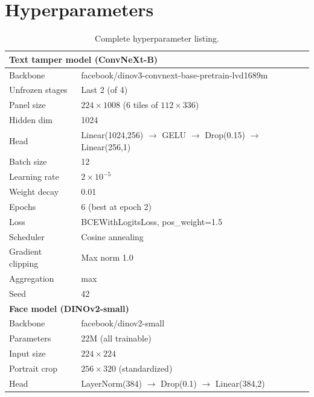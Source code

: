 \documentclass[11pt,a4paper]{article}
\begin{document}



\appendix
\section{Hyperparameters}
\label{app:hparams}

\begin{table}[H]
  \centering
  \small
  \caption{Complete hyperparameter listing.}
  \begin{tabular}{ll}
    \toprule
    \multicolumn{2}{l}{\textbf{Text tamper model (ConvNeXt-B)}} \\
    \midrule
    Backbone          & facebook/dinov3-convnext-base-pretrain-lvd1689m \\
    Unfrozen stages   & Last 2 (of 4) \\
    Panel size        & $224 \times 1008$ (6 tiles of $112 \times 336$) \\
    Hidden dim        & 1024 \\
    Head              & Linear(1024,256) $\rightarrow$ GELU $\rightarrow$ Drop(0.15) $\rightarrow$ Linear(256,1) \\
    Batch size        & 12 \\
    Learning rate     & $2 \times 10^{-5}$ \\
    Weight decay      & 0.01 \\
    Epochs            & 6 (best at epoch 2) \\
    Loss              & BCEWithLogitsLoss, pos\_weight=1.5 \\
    Scheduler         & Cosine annealing \\
    Gradient clipping & Max norm 1.0 \\
    Aggregation       & max \\
    Seed              & 42 \\
    \midrule
    \multicolumn{2}{l}{\textbf{Face model (DINOv2-small)}} \\
    \midrule
    Backbone          & facebook/dinov2-small \\
    Parameters        & 22M (all trainable) \\
    Input size        & $224 \times 224$ \\
    Portrait crop     & $256 \times 320$ (standardized) \\
    Head              & LayerNorm(384) $\rightarrow$ Drop(0.1) $\rightarrow$ Linear(384,2) \\

\end{tabular}
\end{table}
\end{document}
